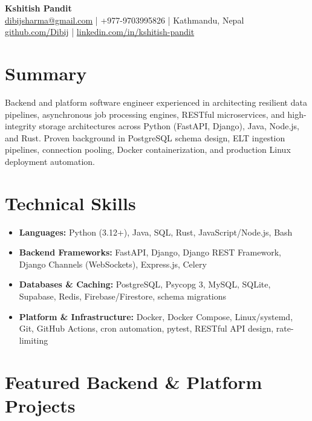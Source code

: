 \documentclass[a4paper,10pt]{article}
\begin{document}
\begin{center}
    {\LARGE \textbf{Kshitish Pandit}} \\[4pt]
    \href{mailto:dibijsharma@gmail.com}{dibijsharma@gmail.com} \quad | \quad +977-9703995826 \quad | \quad Kathmandu, Nepal \\[2pt]
    \href{https://github.com/Dibij}{github.com/Dibij} \quad | \quad
    \href{https://www.linkedin.com/in/kshitish-pandit}{linkedin.com/in/kshitish-pandit}
\end{center}

\vspace{2pt}

\section*{Summary}
Backend and platform software engineer experienced in architecting resilient data pipelines, asynchronous job processing engines, RESTful microservices, and high-integrity storage architectures across Python (FastAPI, Django), Java, Node.js, and Rust. Proven background in PostgreSQL schema design, ELT ingestion pipelines, connection pooling, Docker containerization, and production Linux deployment automation.

\section*{Technical Skills}
\begin{itemize}
    \item \textbf{Languages:} Python (3.12+), Java, SQL, Rust, JavaScript/Node.js, Bash
    \item \textbf{Backend Frameworks:} FastAPI, Django, Django REST Framework, Django Channels (WebSockets), Express.js, Celery
    \item \textbf{Databases \& Caching:} PostgreSQL, Psycopg 3, MySQL, SQLite, Supabase, Redis, Firebase/Firestore, schema migrations
    \item \textbf{Platform \& Infrastructure:} Docker, Docker Compose, Linux/systemd, Git, GitHub Actions, cron automation, pytest, RESTful API design, rate-limiting
\end{itemize}

\section*{Featured Backend \& Platform Projects}
\end{document}
